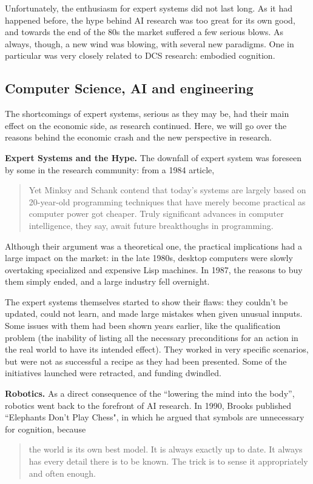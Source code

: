 \documentclass[../main.tex]{subfiles}
\begin{document}
Unfortunately, the enthusiasm for expert systems did not last long. As it had happened before, the hype behind AI research was too great for its own good, and towards the end of the 80s the market suffered a few serious blows. As always, though, a new wind was blowing, with several new paradigms. One in particular was very closely related to DCS research: embodied cognition.

\subsection{Computer Science, AI and engineering}
The shortcomings of expert systems, serious as they may be, had their main effect on the economic side, as research continued. Here, we will go over the reasons behind the economic crash and the new perspective in research.

\vspace{4pt}
\textbf{Expert Systems and the Hype.}
The downfall of expert system was foreseen by some in the research community: from a 1984 article\cite{universityWhyComputersCan1984},
\begin{quote}
    Yet Minksy and Schank contend that today's systems are largely based on 20-year-old programming techniques that have merely become practical as computer power got cheaper. Truly significant advances in computer intelligence, they say, await future breakthoughs in programming.
\end{quote}

Although their argument was a theoretical one, the practical implications had a large impact on the market: in the late 1980s, desktop computers were slowly overtaking specialized and expensive Lisp machines. In 1987, the reasons to buy them simply ended, and a large industry fell overnight.

The expert systems themselves started to show their flaws: they couldn't be updated, could not learn, and made large mistakes when given unusual innputs. Some issues with them had been shown years earlier, like the qualification problem (the inability of listing all the necessary preconditions for an action in the real world to have its intended effect). They worked in very specific scenarios, but were not as successful a recipe as they had been presented. Some of the initiatives launched were retracted, and funding dwindled\cite{mccorduckMachinesWhoThink2004}.

\vspace{4pt}
\textbf{Robotics.} As a direct consequence of the ``lowering the mind into the body'', robotics went back to the forefront of AI research. In 1990, Brooks published ``Elephants Don't Play Chess"\cite{brooksElephantsDonPlay1990}, in which he argued that symbols are unnecessary for cognition, because
\begin{quote}
    the world is its own best model. It is always exactly up to date. It always has every detail there is to be known. The trick is to sense it appropriately and often enough.
\end{quote}
\end{document}
